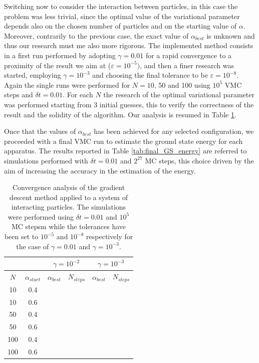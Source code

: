 Switching now to consider the interaction between particles, in this case the problem was less trivial, since the optimal value of the variational parameter depends also on the chosen number of particles and on the starting value of $\alpha$. Moreover, contrarily to the previous case, the exact value of $\alpha_{best}$ is unknown and thus our research must me also more rigorous. The implemented method consists in a first run performed by adopting $\gamma=0.01$ for a rapid convergence to a proximity of the result we aim at ($\varepsilon=10^{-5})$, and then a finer research was started, employing $\gamma=10^{-3}$ and choosing the final tolerance to be $\varepsilon=10^{-8}$. Again the single runs were performed for $N=10$, 50 and 100 using $10^5$ VMC steps and $\delta t =0.01$. For each $N$ the research of the optimal variational parameter was performed starting from 3 initial guesses, this to verify the correctness of the result and the solidity of the algorithm. Our analysis is resumed in Table \ref{tab:gradient_descent_interacting}.

Once that the values of $\alpha_{best}$ has been achieved for any selected configuration, we proceeded with a final VMC run to estimate the ground state energy for each apparatus. The results reported in Table \ref{tab:final_GS_energy} are referred to simulations performed with $\delta t = 0.01$ and $2^{27}$ MC steps, this choice driven by the aim of increasing the accuracy in the estimation of the energy. 


\begin{table}[H]
    \centering
    \begin{tabular}{cccccc}
         & & \multicolumn{2}{c}{$\gamma=10^{-2}$} & \multicolumn{2}{c}{$\gamma=10^{-3}$} \\
         \midrule
        $N$ & $\alpha_{start}$ & $\alpha_{best}$ & $N_{steps}$ & $\alpha_{best}$ & $N_{steps}$ \\
        \midrule
        10 & 0.4 & & & & \\
        10 & 0.6 & & & & \\
        50 & 0.4 & & & & \\
        50 & 0.6 & & & & \\
        100 & 0.4 & & & & \\
        100 & 0.6 & & & & \\
        \bottomrule
    \end{tabular}
    \caption{Convergence analysis of the gradient descent method applied to a system of interacting particles. The simulations were performed using $\delta t = 0.01$ and $10^5$ MC stepsm while the tolerances have been set to $10^{-5}$ and $10^{-8}$ respectively for the case of $\gamma=0.01$ and $\gamma=10^{-3}$.}
    \label{tab:gradient_descent_interacting}
\end{table}


